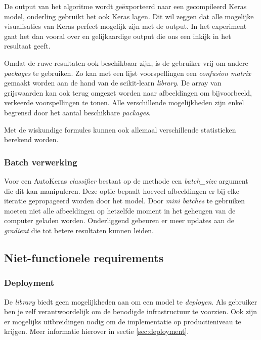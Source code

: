 De output van het algoritme wordt geëxporteerd naar een gecompileerd Keras model, onderling gebruikt het ook Keras lagen. Dit wil zeggen dat alle mogelijke visualisaties van Keras perfect mogelijk zijn met de output. In het experiment gaat het dan vooral over  en gelijkaardige output die ons een inkijk in het resultaat geeft.

Omdat de ruwe resultaten ook beschikbaar zijn, is de gebruiker vrij om andere \textit{packages} te gebruiken. Zo kan met een lijst voorspellingen een \textit{confusion matrix} gemaakt worden aan de hand van de scikit-learn \textit{library}. De array van grijswaarden kan ook terug omgezet worden naar afbeeldingen om bijvoorbeeld, verkeerde voorspellingen te tonen. Alle verschillende mogelijkheden zijn enkel begrensd door het aantal beschikbare \textit{packages}.

Met de wiskundige formules kunnen ook allemaal verschillende statistieken berekend worden.

\subsubsection{Batch verwerking}
\label{sucsubsec:autokeras-fr-batch}

Voor een AutoKeras \textit{classifier} bestaat op de  methode een \textit{batch\_size} argument die dit kan manipuleren. Deze optie bepaalt hoeveel afbeeldingen er bij elke iteratie gepropageerd worden door het model. Door \textit{mini batches} te gebruiken moeten niet alle afbeeldingen op hetzelfde moment in het geheugen van de computer geladen worden. Onderliggend gebeuren er meer updates aan de \textit{gradient} die tot betere resultaten kunnen leiden.

\subsection{Niet-functionele requirements}
\label{subsec:autokeras-nfr} 

\subsubsection{Deployment}
\label{sucsubsec:autokeras-nfr-deployment}

De \textit{library} biedt geen mogelijkheden aan om een model te \textit{deployen}. Als gebruiker ben je zelf verantwoordelijk om de benodigde infrastructuur te voorzien. Ook zijn er mogelijks uitbreidingen nodig om de implementatie op productieniveau te krijgen. Meer informatie hierover in sectie \ref{sec:deployment}.

